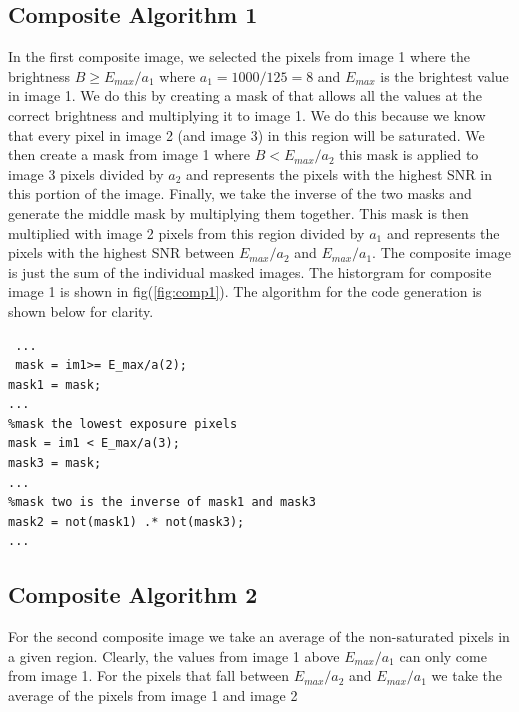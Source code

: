 \documentclass[a4paper]{article}
\begin{document}
\subsection{Composite Algorithm 1}
 In the first composite image, we selected the pixels from image 1 where the brightness $B \ge E_{max} /a_1$ where $a_1 = 1000/125 = 8$ and $E_{max}$ is the brightest value in image 1. We do this by creating a mask of that allows all the values at the correct brightness and multiplying it to image 1.  We do this because we know that every pixel in image 2 (and image 3) in this region will be saturated.  We then create a mask from image 1 where $B  <E_{max} /a_2$ this mask is applied to image 3 pixels  divided by $a_2$ and represents the pixels with the highest SNR in this portion of the image.  Finally, we take the inverse of the two masks and generate the middle mask by multiplying them together.  This mask is then multiplied with image 2 pixels from this region divided by $a_1$ and represents the pixels with the highest SNR between $E_{max}/a_{2}$ and $E_{max}/a_1$.  The composite image is just the sum of the individual masked images.  The historgram for composite image 1 is shown in fig(\ref{fig:comp1}). The algorithm for the code generation is shown below for clarity.
 \begin{verbatim}
 ...
 mask = im1>= E_max/a(2);
mask1 = mask;
...
%mask the lowest exposure pixels
mask = im1 < E_max/a(3);
mask3 = mask;
...
%mask two is the inverse of mask1 and mask3
mask2 = not(mask1) .* not(mask3);
...
 \end{verbatim}

\FloatBarrier
\subsection{Composite Algorithm 2}
For the second composite image we take an average of the non-saturated pixels in a given region.  Clearly, the values from image 1 above $E_{max}/a_1$ can only come from image 1.  For the pixels that fall between  $E_{max}/a_{2}$ and $E_{max}/a_1$ we take the average of the pixels from image 1 and image 2
\end{document}
